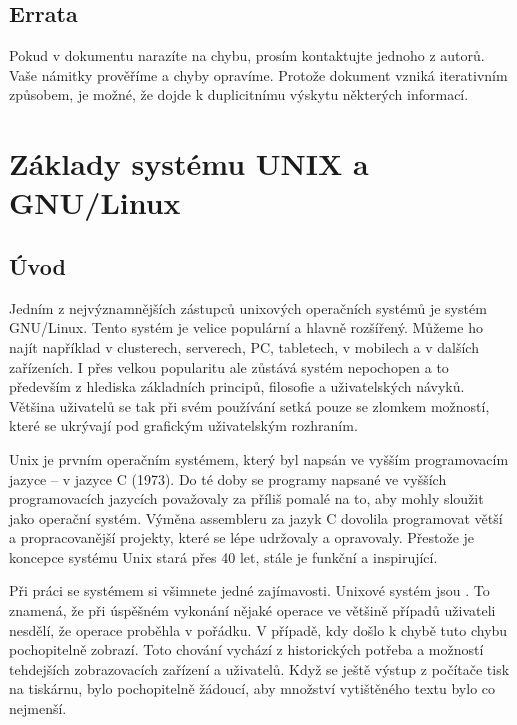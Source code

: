 \documentclass{article}
\begin{document}
\subsection{Errata}
Pokud v dokumentu narazíte na chybu, prosím kontaktujte jednoho z autorů. Vaše námitky prověříme a chyby opravíme. Protože dokument vzniká iterativním způsobem, je možné, že dojde k duplicitnímu výskytu některých informací.

\newpage

\section{Základy systému UNIX a GNU/Linux}
\subsection{Úvod}
Jedním z nejvýznamnějších zástupců unixových operačních systémů je systém GNU/Linux. Tento systém je velice populární a hlavně rozšířený. Můžeme ho
najít například v clusterech, serverech, PC, tabletech, v mobilech a v dalších zařízeních. I přes velkou popularitu ale zůstává systém nepochopen a to
především z hlediska základních principů, filosofie a uživatelských návyků. Většina  uživatelů se tak při svém používání setká pouze se zlomkem možností, které se ukrývají pod grafickým uživatelským rozhraním. 

Unix je prvním operačním systémem, který byl napsán ve vyšším programovacím jazyce -- v jazyce C (1973). Do té doby se programy napsané ve vyšších programovacích jazycích považovaly za příliš pomalé na to, aby mohly sloužit jako operační systém. Výměna assembleru za jazyk C dovolila programovat větší a propracovanější projekty, které se lépe udržovaly a opravovaly. Přestože je koncepce systému Unix stará přes 40 let, stále je funkční a inspirující. 

Při práci se systémem si všimnete jedné zajímavosti. Unixové systém jsou . To znamená, že při úspěšném vykonání nějaké operace ve většině případů uživateli nesdělí, že operace proběhla v pořádku. V případě, kdy došlo k chybě tuto chybu pochopitelně zobrazí. Toto chování vychází z historických potřeba a možností tehdejších zobrazovacích zařízení a uživatelů. Když se ještě výstup z počítače tisk na tiskárnu, bylo pochopitelně žádoucí, aby množství vytištěného textu bylo co nejmenší.
\end{document}

